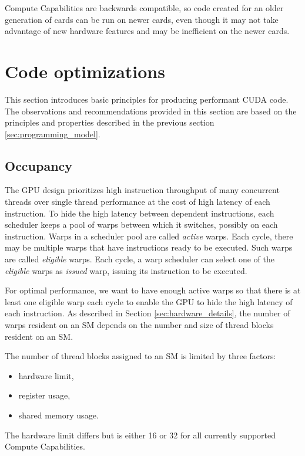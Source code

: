 Compute Capabilities are backwards compatible, so code created for an older generation of cards can be run on newer cards, even though it may not take advantage of new hardware features and may be inefficient on the newer cards.

\section{Code optimizations}


This section introduces basic principles for producing performant CUDA code.
The observations and recommendations provided in this section are based on the principles and properties described in the previous section \ref{sec:programming_model}.

\subsection{Occupancy}
\label{sec:occupancy}

The GPU design prioritizes high instruction throughput of many concurrent threads over single thread performance at the cost of high latency of each instruction. To hide the high latency between dependent instructions, each scheduler keeps a pool of warps between which it switches, possibly on each instruction. Warps in a scheduler pool are called \textit{active} warps.
Each cycle, there may be multiple warps that have instructions ready to be executed. Such warps are called \textit{eligible} warps.
Each cycle, a warp scheduler can select one of the \textit{eligible} warps as \textit{issued} warp, issuing its instruction to be executed.

For optimal performance, we want to have enough active warps so that there is at least one eligible warp each cycle to enable the GPU to hide the high latency of each instruction. As described in Section \ref{sec:hardware_details}, the number of warps resident on an SM depends on the number and size of thread blocks resident on an SM.

The number of thread blocks assigned to an SM is limited by three factors:

\begin{itemize}
	\item hardware limit,
	\item register usage,
	\item shared memory usage.
\end{itemize}

The hardware limit differs but is either 16 or 32 for all currently supported Compute Capabilities. 

